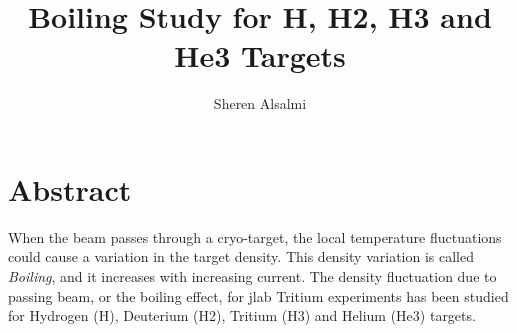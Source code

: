 \documentclass[11pt]{article}
\begin{document}
\title{Boiling Study for H, H2, H3 and He3 Targets}
\author{Sheren Alsalmi}
\date{}
\maketitle
\section*{Abstract}
When the beam passes through a cryo-target, the local temperature fluctuations could cause a variation in the target density. This density variation is called \emph{Boiling}, and it increases with increasing current. The density fluctuation due to passing beam, or the boiling effect, for jlab Tritium experiments has been studied for Hydrogen (H), Deuterium (H2), Tritium (H3) and Helium (He3) targets.\par
\end{document}
